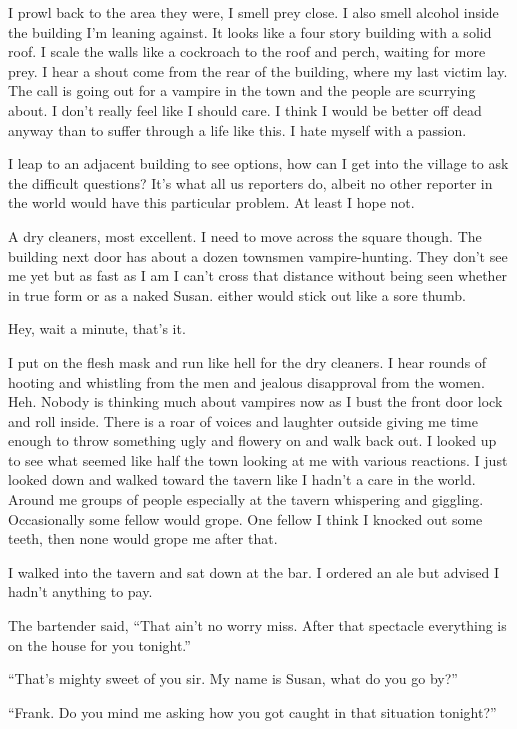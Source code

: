 I prowl back to the area they were, I smell prey close. I also smell alcohol inside the building I'm leaning against. It looks like a four story building with a solid roof. I scale the walls like a cockroach to the roof and perch, waiting for more prey. I hear a shout come from the rear of the building, where my last victim lay. The call is going out for a vampire in the town and the people are scurrying about. I don't really feel like I should care. I think I would be better off dead anyway than to suffer through a life like this. I hate myself with a passion. 

I leap to an adjacent building to see options, how can I get into the village to ask the difficult questions? It's what all us reporters do, albeit no other reporter in the world would have this particular problem. At least I hope not.

A dry cleaners, most excellent. I need to move across the square though. The building next door has about a dozen townsmen vampire-hunting. They don't see me yet but as fast as I am I can't cross that distance without being seen whether in true form or as a naked Susan. either would stick out like a sore thumb.

Hey, wait a minute, that's it.

I put on the flesh mask and run like hell for the dry cleaners. I hear rounds of hooting and whistling from the men and jealous disapproval from the women. Heh. Nobody is thinking much about vampires now as I bust the front door lock and roll inside. There is a roar of voices and laughter outside giving me time enough to throw something ugly and flowery on and walk back out. I looked up to see what seemed like half the town looking at me with various reactions. I just looked down and walked toward the tavern like I hadn't a care in the world. Around me groups of people especially at the tavern whispering and giggling. Occasionally some fellow would grope. One fellow I think I knocked out some teeth, then none would grope me after that.

I walked into the tavern and sat down at the bar. I ordered an ale but advised I hadn't anything to pay.

The bartender said, ``That ain't no worry miss. After that spectacle everything is on the house for you tonight.''

``That's mighty sweet of you sir. My name is Susan, what do you go by?''

``Frank. Do you mind me asking how you got caught in that situation tonight?''


